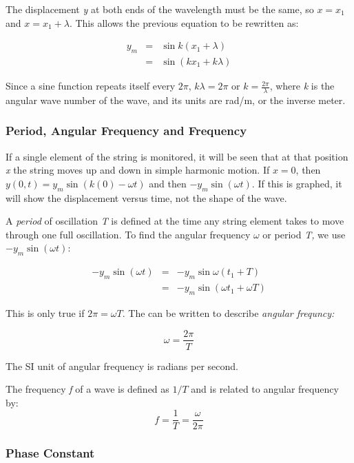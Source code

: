 \documentclass[english]{article}
\begin{document}
The displacement \emph{y} at both ends of the wavelength must be the
same, so $x=x_{1}$and $x=x_{1}+\lambda$. This allows the previous
equation to be rewritten as:

\begin{eqnarray*}
y_{m} & = & \sin k(x_{1}+\lambda)\\
 & = & \sin(kx_{1}+k\lambda)
\end{eqnarray*}


Since a sine function repeats itself every $2\pi$, $k\lambda=2\pi$
or $k=\frac{2\pi}{\lambda}$, where \emph{k }is the angular wave number
of the wave, and its units are rad/m, or the inverse meter.


\subsubsection*{Period, Angular Frequency and Frequency}

If a single element of the string is monitored, it will be seen that
at that position \emph{x }the string moves up and down in simple harmonic
motion. If $x=0$, then $y(0,t)=y_{m}\sin(k(0)-\omega t)$ and then
$-y_{m}\sin(\omega t)$. If this is graphed, it will show the displacement
versus time, not the shape of the wave.

A \emph{period} of oscillation \emph{T }is defined at the time any
string element takes to move through one full oscillation. To find
the angular frequency $\omega$ or period \emph{T, }we use $-y_{m}\sin(\omega t)$:

\begin{eqnarray*}
-y_{m}\sin(\omega t) & = & -y_{m}\sin\omega(t_{1}+T)\\
 & = & -y_{m}\sin(\omega t_{1}+\omega T)
\end{eqnarray*}


This is only true if $2\pi=\omega T$. The can be written to describe
\emph{angular frequncy:}

\[
\omega=\frac{2\pi}{T}
\]


The SI unit of angular frequency is radians per second.

The frequency \emph{f }of a wave is defined as $1/T$ and is related
to angular frequency by:
\[
f=\frac{1}{T}=\frac{\omega}{2\pi}
\]



\subsubsection*{Phase Constant}
\end{document}
